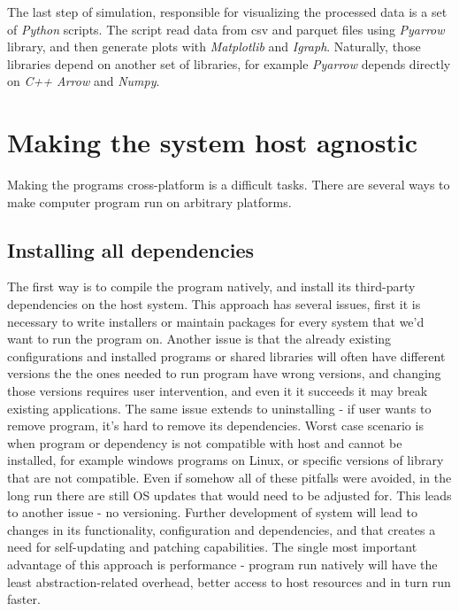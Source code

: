 The last step of simulation, responsible for visualizing the processed data is a set of \textit{Python} scripts. The script read data from csv and parquet files using \textit{Pyarrow} library, and then generate plots with \textit{Matplotlib} and \textit{Igraph}. Naturally, those libraries depend on another set of libraries, for example \textit{Pyarrow} depends directly on \textit{C++ Arrow} and \textit{Numpy}. 
\newpage
\section{Making the system host agnostic}
Making the programs cross-platform is a difficult tasks. There are several ways to make computer program run on arbitrary platforms.
\subsection{Installing all dependencies}
The first way is to compile the program natively, and install its third-party dependencies on the host system. This approach has several issues, first it is necessary to write installers or maintain packages for every system that we'd want to run the program on. Another issue is that the already existing configurations and installed programs or shared libraries will often have different versions the the ones needed to run program have wrong versions, and changing those versions requires user intervention, and even it it succeeds it may break existing applications. The same issue extends to uninstalling - if user wants to remove program, it's hard to remove its dependencies. Worst case scenario is when program or dependency is not compatible with host and cannot be installed, for example windows programs on Linux, or specific versions of library that are not compatible. Even if somehow all of these pitfalls were avoided, in the long run there are still OS updates that would need to be adjusted for. This leads to another issue - no versioning. Further development of system will lead to changes in its functionality, configuration and dependencies, and that creates a need for self-updating and patching capabilities.  The single most important advantage of this approach is performance - program run natively will have the least abstraction-related overhead, better access to host resources and in turn run faster. 
